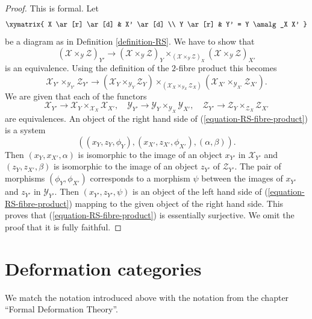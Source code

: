 \begin{proof}
This is formal. Let 
$$
\xymatrix{
X \ar[r] \ar[d] & X' \ar[d] \\
Y \ar[r] & Y' = Y \amalg_X X'
}
$$
be a diagram as in Definition \ref{definition-RS}. We have to show that
$$
(\mathcal{X} \times_{\mathcal{Y}} \mathcal{Z})_{Y'}
\longrightarrow
(\mathcal{X} \times_{\mathcal{Y}} \mathcal{Z})_Y
\times_{(\mathcal{X} \times_{\mathcal{Y}} \mathcal{Z})_X}
(\mathcal{X} \times_{\mathcal{Y}} \mathcal{Z})_{X'}
$$
is an equivalence. Using the definition of the $2$-fibre product
this becomes
\begin{equation}
\label{equation-RS-fibre-product}
\mathcal{X}_{Y'} \times_{\mathcal{Y}_{Y'}} \mathcal{Z}_{Y'}
\longrightarrow
(\mathcal{X}_Y \times_{\mathcal{Y}_Y} \mathcal{Z}_Y)
\times_{(\mathcal{X}_X \times_{\mathcal{Y}_X} \mathcal{Z}_X)}
(\mathcal{X}_{X'} \times_{\mathcal{Y}_{X'}} \mathcal{Z}_{X'}).
\end{equation}
We are given that each of the functors
$$
\mathcal{X}_{Y'} \to \mathcal{X}_Y \times_{\mathcal{X}_X} \mathcal{X}_{X'},
\quad
\mathcal{Y}_{Y'} \to \mathcal{Y}_Y \times_{\mathcal{Y}_X} \mathcal{Y}_{X'},
\quad
\mathcal{Z}_{Y'} \to
\mathcal{Z}_Y \times_{\mathcal{Z}_X} \mathcal{Z}_{X'}
$$
are equivalences. An object of the right hand side of
(\ref{equation-RS-fibre-product}) is a system
$$
((x_Y, z_Y, \phi_Y), (x_{X'}, z_{X'}, \phi_{X'}), (\alpha, \beta)).
$$
Then $(x_Y, x_{X'}, \alpha)$ is isomorphic to the image of an object
$x_{Y'}$ in $\mathcal{X}_{Y'}$ and $(z_Y, z_{X'}, \beta)$ is isomorphic
to the image of an object $z_{Y'}$ of $\mathcal{Z}_{Y'}$. The pair of
morphisms $(\phi_Y, \phi_{X'})$ corresponds to a morphism $\psi$
between the images of $x_{Y'}$ and $z_{Y'}$ in $\mathcal{Y}_{Y'}$.
Then $(x_{Y'}, z_{Y'}, \psi)$ is an object of the left hand side of
(\ref{equation-RS-fibre-product}) mapping to the given object of the
right hand side. This proves that (\ref{equation-RS-fibre-product}) is
essentially surjective. We omit the proof that it is fully faithful.
\end{proof}





\section{Deformation categories}
\label{section-deformation-categories}

\noindent
We match the notation introduced above with the notation from the
chapter ``Formal Deformation Theory''.

